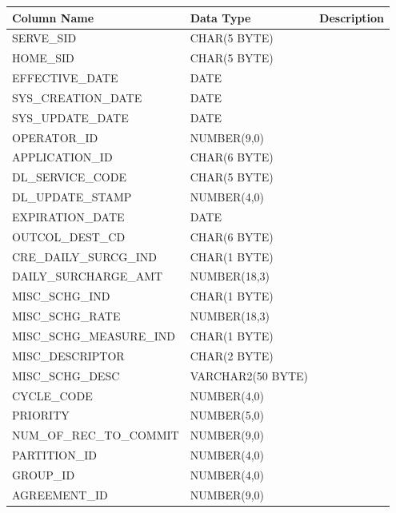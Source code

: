 \documentclass[12pt,twoside]{article}
\begin{document}
\begin{center}
\begin{tabular}{lll}
\hline
 \textbf{Column Name}      &  \textbf{Data Type}  &  \textbf{Description}  \\
\hline
 SERVE\_SID                &  CHAR(5 BYTE)        &                        \\
 HOME\_SID                 &  CHAR(5 BYTE)        &                        \\
 EFFECTIVE\_DATE           &  DATE                &                        \\
 SYS\_CREATION\_DATE       &  DATE                &                        \\
 SYS\_UPDATE\_DATE         &  DATE                &                        \\
 OPERATOR\_ID              &  NUMBER(9,0)         &                        \\
 APPLICATION\_ID           &  CHAR(6 BYTE)        &                        \\
 DL\_SERVICE\_CODE         &  CHAR(5 BYTE)        &                        \\
 DL\_UPDATE\_STAMP         &  NUMBER(4,0)         &                        \\
 EXPIRATION\_DATE          &  DATE                &                        \\
 OUTCOL\_DEST\_CD          &  CHAR(6 BYTE)        &                        \\
 CRE\_DAILY\_SURCG\_IND    &  CHAR(1 BYTE)        &                        \\
 DAILY\_SURCHARGE\_AMT     &  NUMBER(18,3)        &                        \\
 MISC\_SCHG\_IND           &  CHAR(1 BYTE)        &                        \\
 MISC\_SCHG\_RATE          &  NUMBER(18,3)        &                        \\
 MISC\_SCHG\_MEASURE\_IND  &  CHAR(1 BYTE)        &                        \\
 MISC\_DESCRIPTOR          &  CHAR(2 BYTE)        &                        \\
 MISC\_SCHG\_DESC          &  VARCHAR2(50 BYTE)   &                        \\
 CYCLE\_CODE               &  NUMBER(4,0)         &                        \\
 PRIORITY                  &  NUMBER(5,0)         &                        \\
 NUM\_OF\_REC\_TO\_COMMIT  &  NUMBER(9,0)         &                        \\
 PARTITION\_ID             &  NUMBER(4,0)         &                        \\
 GROUP\_ID                 &  NUMBER(4,0)         &                        \\
 AGREEMENT\_ID             &  NUMBER(9,0)         &                        \\
\hline
\end{tabular}
\end{center}
\end{document}
